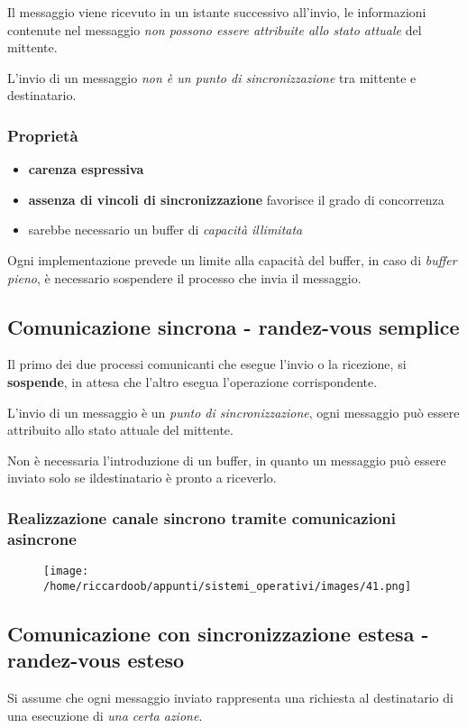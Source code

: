 Il messaggio viene ricevuto in un istante successivo all'invio, le informazioni contenute nel messaggio \textit{non possono essere attribuite allo stato attuale} del mittente.

L'invio di un messaggio \textit{non è un punto di sincronizzazione} tra mittente e destinatario.

\subsubsection{Proprietà}
\begin{itemize}
    \item \textbf{carenza espressiva}
    \item \textbf{assenza di vincoli di sincronizzazione} favorisce il grado di concorrenza
    \item sarebbe necessario un buffer di \textit{capacità illimitata}
\end{itemize}

Ogni implementazione prevede un limite alla capacità del buffer, in caso di \textit{buffer pieno}, è necessario sospendere il processo che invia il messaggio.

\subsection{Comunicazione sincrona - randez-vous semplice}
Il primo dei due processi comunicanti che esegue l'invio o la ricezione, si \textbf{sospende}, in attesa che l'altro esegua l'operazione corrispondente.

L'invio di un messaggio è un \textit{punto di sincronizzazione}, ogni messaggio può essere attribuito allo stato attuale del mittente.

Non è necessaria l'introduzione di un buffer, in quanto un messaggio può essere inviato solo se ildestinatario è pronto a riceverlo.

\subsubsection{Realizzazione canale sincrono tramite comunicazioni asincrone}
\begin{figure}[H]
    \centering
    \texttt{[image: /home/riccardoob/appunti/sistemi\_operativi/images/41.png]}
\end{figure}

\subsection{Comunicazione con sincronizzazione estesa - randez-vous esteso}
Si assume che ogni messaggio inviato rappresenta una richiesta al destinatario di una esecuzione di \textit{una certa azione}.

